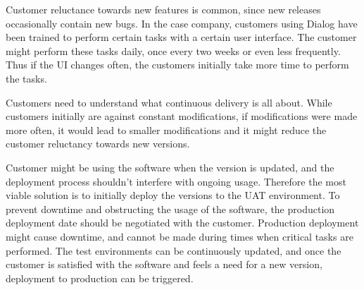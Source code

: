 \documentclass[english]{tktltiki2}
\theoremstyle{definition}
\theoremstyle{remark}
\begin{document}
Customer reluctance towards new features is common, since new releases occasionally contain new bugs. In the case company, customers using Dialog have been trained to perform certain tasks with a certain user interface. The customer might perform these tasks daily, once every two weeks or even less frequently. Thus if the UI changes often, the customers initially take more time to perform the tasks. 

Customers need to understand what continuous delivery is all about. While customers initially are against constant modifications, if modifications were made more often, it would lead to smaller modifications and it might reduce the customer reluctancy towards new versions. 



Customer might be using the software when the version is updated, and the deployment process shouldn't interfere with ongoing usage. Therefore the most viable solution is to initially deploy the versions to the UAT environment. To prevent downtime and obstructing the usage of the software, the production deployment date should be negotiated with the customer. Production deployment might cause downtime, and cannot be made during times when critical tasks are performed. The test environments can be continuously updated, and once the customer is satisfied with the software and feels a need for a new version, deployment to production can be triggered.   
\end{document}
